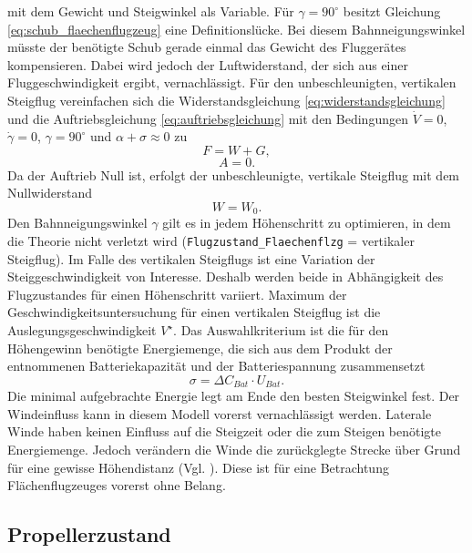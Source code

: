mit dem Gewicht und Steigwinkel als Variable.
Für \ensuremath{\gamma = 90^\circ} besitzt Gleichung \ref{eq:schub_flaechenflugzeug} eine Definitionslücke. Bei diesem Bahnneigungswinkel müsste der benötigte Schub gerade einmal das Gewicht des Fluggerätes kompensieren. Dabei wird jedoch der Luftwiderstand, der sich aus einer Fluggeschwindigkeit ergibt, vernachlässigt. 
Für den unbeschleunigten, vertikalen Steigflug vereinfachen sich die Widerstandsgleichung \ref{eq:widerstandsgleichung} und die Auftriebsgleichung \ref{eq:auftriebsgleichung} mit den Bedingungen \ensuremath{\dot{V} = 0}, \ensuremath{\dot{\gamma} = 0}, \ensuremath{\gamma = 90^\circ} und \ensuremath{\alpha + \sigma \approx 0} zu 
\begin{equation}
	F = W + G , 
\end{equation}
\begin{equation}
	A = 0 .
\end{equation}
Da der Auftrieb Null ist, erfolgt der unbeschleunigte, vertikale Steigflug mit dem Nullwiderstand
\begin{equation}
	W = W_0 .
\end{equation}
Den Bahnneigungswinkel \ensuremath{\gamma} gilt es in jedem Höhenschritt zu optimieren, in dem die Theorie nicht verletzt wird (\texttt{Flugzustand\_Flaechenflzg} = vertikaler Steigflug). Im Falle des vertikalen Steigflugs ist eine Variation der Steiggeschwindigkeit von Interesse. Deshalb werden beide in Abhängigkeit des Flugzustandes für einen Höhenschritt variiert. Maximum der Geschwindigkeitsuntersuchung für einen vertikalen Steigflug ist die Auslegungsgeschwindigkeit \ensuremath{V^\star}. Das Auswahlkriterium ist die für den Höhengewinn benötigte Energiemenge, die sich aus dem Produkt der entnommenen Batteriekapazität und der Batteriespannung zusammensetzt
\begin{equation}
	\sigma = \Delta C_{Bat}\cdot U_{Bat}.
\end{equation}
Die minimal aufgebrachte Energie legt am Ende den besten Steigwinkel fest.
Der Windeinfluss kann in diesem Modell vorerst vernachlässigt werden. Laterale Winde haben keinen Einfluss auf die Steigzeit oder die zum Steigen benötigte Energiemenge. Jedoch verändern die Winde die zurückglegte Strecke über Grund für eine gewisse Höhendistanz (Vgl. \cite[S.241-242]{Scheiderer.2008}). Diese ist für eine Betrachtung Flächenflugzeuges vorerst ohne Belang. 


\subsection{Propellerzustand}
\label{subsec:propellerzustand}

